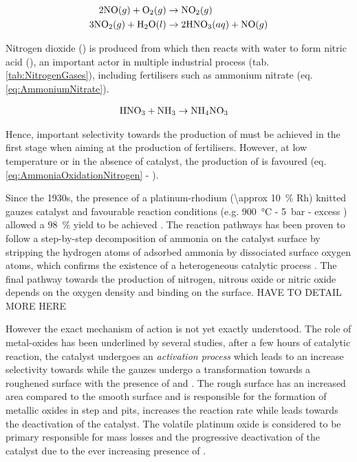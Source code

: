 \begin{align}
    \label{eq:Stage2}
    2 \nitricoxide (g) + \dioxygen (g) & \rightarrow \nitrogendioxide (g) \\
    \label{eq:Stage3}
    3 \nitrogendioxide (g) + \water (l) & \rightarrow 2\nitricacid (aq) + \nitricoxide (g)
\end{align}

Nitrogen dioxide (\nitrogendioxide) is produced from  which then reacts with water to form nitric acid (\nitricacid), an important actor in multiple industrial process (tab. \ref{tab:NitrogenGases}), including fertilisers such as ammonium nitrate (eq. \ref{eq:AmmoniumNitrate}).

\begin{align}
    \label{eq:AmmoniumNitrate}
    \nitricacid + \ammonia & \rightarrow \ammoniumnitrate
\end{align}

Hence, important selectivity towards the production of  must be achieved in the first stage when aiming at the production of fertilisers.
However, at low temperature or in the absence of catalyst, the production of  is favoured (eq. \ref{eq:AmmoniaOxidationNitrogen} - \cite{Hatscher2008}).

Since the 1930s, the presence of a platinum-rhodium (\qty{\approx 10}{\percent} Rh) knitted gauzes catalyst and favourable reaction conditions (e.g. \qty{900}{\degreeCelsius} - \qty{5}{\bar} - excess \dioxygen) allowed a \qty{98}{\percent}  yield to be achieved \parencite{Handforth1934, Heck1982}.
The reaction pathways has been proven to follow a step-by-step decomposition of ammonia on the catalyst surface by stripping the hydrogen atoms of adsorbed ammonia by dissociated surface oxygen atoms, which confirms the existence of a heterogeneous catalytic process \parencite{Bradley1995,PerezRamirez2004}.
The final pathway towards the production of nitrogen, nitrous oxide or nitric oxide depends on the oxygen density and binding on the surface.
HAVE TO DETAIL MORE HERE

However the exact mechanism of action is not yet exactly understood.
The role of metal-oxides has been underlined by several studies, after a few hours of catalytic reaction, the catalyst undergoes an \textit{activation process} which leads to an increase selectivity towards  while the gauzes undergo a transformation towards a roughened surface with the presence of  and .
The rough surface has an increased area compared to the smooth surface and is responsible for the formation of metallic oxides in step and pits,  increases the reaction rate while  leads towards the deactivation of the catalyst.
The volatile platinum oxide is considered to be primary responsible for mass losses and the progressive deactivation of the catalyst due to the ever increasing presence of  \parencite{McCabe1986}.

